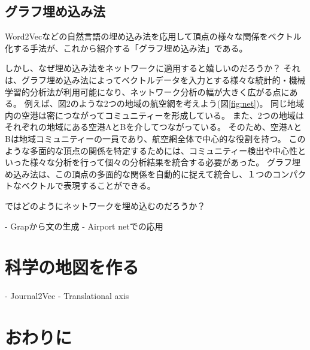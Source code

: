 \documentclass[J]{scitrans}
\begin{document}
\subsection{グラフ埋め込み法}

Word2Vecなどの自然言語の埋め込み法を応用して頂点の様々な関係をベクトル化する手法が、これから紹介する「グラフ埋め込み法」である。

しかし、なぜ埋め込み法をネットワークに適用すると嬉しいのだろうか？
それは、グラフ埋め込み法によってベクトルデータを入力とする様々な統計的・機械学習的分析法が利用可能になり、ネットワーク分析の幅が大きく広がる点にある。
例えば、図2のような2つの地域の航空網を考えよう(図\ref{fig:net})。
同じ地域内の空港は密につながってコミュニティーを形成している。
また、2つの地域はそれぞれの地域にある空港AとBを介してつながっている。
そのため、空港AとBは地域コミュニティーの一員であり、航空網全体で中心的な役割を持つ。
このような多面的な頂点の関係を特定するためには、コミュニティー検出や中心性といった様々な分析を行って個々の分析結果を統合する必要があった。
グラフ埋め込み法は、この頂点の多面的な関係を自動的に捉えて統合し、１つのコンパクトなベクトルで表現することができる。

ではどのようにネットワークを埋め込むのだろうか？

    - Grapから文の生成
- Airport netでの応用

\section{科学の地図を作る}

- Journal2Vec
- Translational axis




\section{おわりに}


\acknowledgement





\end{document}
